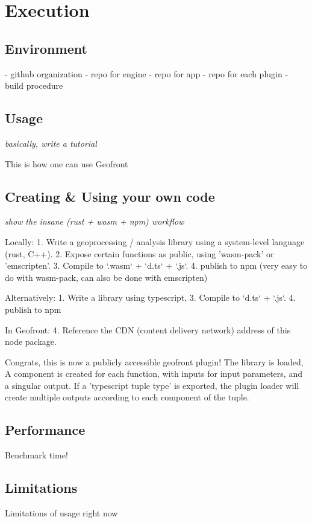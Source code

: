 \chapter{Execution}%

\section{Environment}%
- github organization 
- repo for engine 
- repo for app 
- repo for each plugin
- build procedure

\section{Usage}%

\emph{basically, write a tutorial}

This is how one can use Geofront

\section{Creating \& Using your own code}
\emph{show the insane (rust + wasm + npm) workflow}

Locally: 
1. Write a geoprocessing / analysis library using a system-level language (rust, C++).
2. Expose certain functions as public, using 'wasm-pack' or 'emscripten'.
3. Compile to `.wasm` + `d.ts` + `.js`.
4. publish to npm (very easy to do with wasm-pack, can also be done with emscripten)

Alternatively: 
1. Write a library using typescript, 
3. Compile to `d.ts` + `.js`.
4. publish to npm 

In Geofront: 
4. Reference the CDN (content delivery network) address of this node package. 

Congrats, this is now a publicly accessible geofront plugin!
The library is loaded, A component is created for each function, with inputs for input parameters, and a singular output. If a 'typescript tuple type' is exported, the plugin loader will create multiple outputs according to each component of the tuple.



\section{Performance}%

Benchmark time!

\section{Limitations}%

Limitations of usage right now
